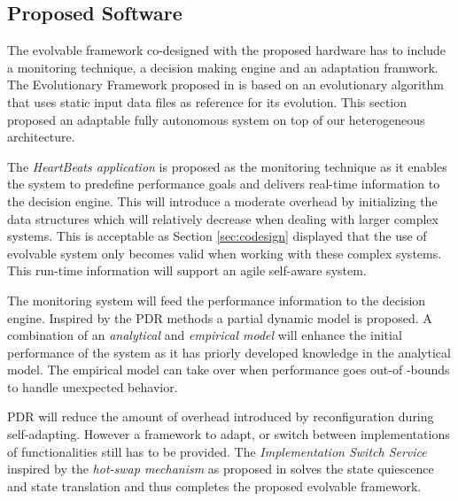\subsection{Proposed Software}
\label{sec:prosoftware}
The evolvable framework co-designed with the proposed hardware has to include a monitoring technique, a decision making engine and an adaptation framwork. The Evolutionary Framework proposed in \cite{PDR} is based on an evolutionary algorithm that uses static input data files as reference for its evolution. This section proposed an adaptable fully autonomous system on top of our heterogeneous architecture. 

The \emph{HeartBeats application} is proposed as the monitoring technique as it enables the system to predefine performance goals and delivers real-time information to the decision engine. This will introduce a moderate overhead by initializing the data structures which will relatively decrease when dealing with larger complex systems. This is acceptable as Section \ref{sec:codesign} displayed that the use of evolvable system only becomes valid when working with these complex systems. This run-time information will support an agile self-aware system. 

The monitoring system will feed the performance information to the decision engine. Inspired by the PDR methods a partial dynamic model is proposed. A combination of an \emph{analytical} and \emph{empirical model} will enhance the initial performance of the system as it has priorly developed knowledge in the analytical model. The empirical model can take over when performance goes out-of -bounds to handle unexpected behavior. 

PDR will reduce the amount of overhead introduced by reconfiguration during self-adapting. However a framework to adapt, or switch between implementations of functionalities still has to be provided. The \emph{Implementation Switch Service} inspired by the \emph{hot-swap mechanism} as proposed in \cite{selfaware} solves the state quiescence and state translation and thus completes the proposed evolvable framework.
